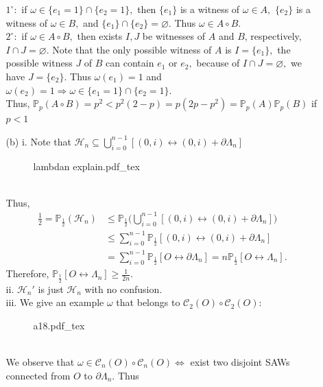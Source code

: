 \documentclass[12pt,a4paper]{report}
\theoremstyle{definition}
\newcommand{\incfig}[1]{%
{#1.pdf_tex}
}
\begin{document}
\begin{enumerate}
\begin{enumerate}
\[        \]
        $1^{\circ}:$ if $\omega\in \{e_1=1\}\cap \{e_2=1\},$ then $\{e_1\}$ is a witness of $\omega \in A,$ $\{e_2\}$ is a witness of $\omega\in B,$ and $\{e_1\}\cap\{e_2\}=\varnothing.$ Thus $\omega\in A\circ B.$\\[5pt]
        $2^{\circ}:$ if $\omega\in A\circ B,$ then exists $I,J$ be witnesses of $A$ and $B$, respectively, $I\cap J=\varnothing.$ Note that the only possible witness of $A$ is $I=\{e_1\},$ the possible witness $J$ of $B$ can contain $e_1$ or $e_2,$ because of $I\cap J=\varnothing,$ we have $J=\{e_2\}.$ Thus $\omega(e_1)=1$ and $\omega(e_2)=1\Rightarrow \omega\in \{e_1=1\}\cap\{e_2=1\}.$\\[7pt]
        Thus, $\mathbb{P}_p(A\circ B)=p^2<p^2(2-p)=p(2p-p^2)=\mathbb{P}_p(A)\mathbb{P}_{p}(B)$ if $p<1$
        \item[(b)] i. Note that $\mathcal{H}_{n}\subseteq \bigcup_{i=0}^{n-1}[(0,i)\leftrightarrow (0,i)+\partial\Lambda_n]$
    	\begin{figure}[htp]
    	\centering
        \def\svgwidth{8cm}
        \incfig{lambdan explain}
        \end{figure}\\
        Thus,
        \newpage
        \begin{align*}
        \frac{1}{2}=\mathbb{P}_\frac{1}{2}(\mathcal{H}_{n})&\leq \mathbb{P}_\frac{1}{2}\Big(\bigcup_{i=0}^{n-1}[(0,i)\leftrightarrow (0,i)+\partial\Lambda_n]\Big)\\
        &\leq\sum_{i=0}^{n-1}\mathbb{P}_\frac{1}{2}[(0,i)\leftrightarrow (0,i)+\partial\Lambda_n]\\
        &=\sum_{i=0}^{n-1}\mathbb{P}_\frac{1}{2}[O\leftrightarrow\partial\Lambda_n]=n\mathbb{P}_\frac{1}{2}[O\leftrightarrow\Lambda_n].
        \end{align*}
        Therefore, $\mathbb{P}_\frac{1}{2}[O\leftrightarrow\Lambda_n]\geq \frac{1}{2n}.$\\[7pt]
        ii. $\mathcal{H}_n'$ is just $\mathcal{H}_n$ with no confusion.\\[7pt]
        iii. We give an example $\omega$ that belongs to $\mathcal{C}_2(O)\circ \mathcal{C}_2(O):$
    	\begin{figure}[htp]
    	\centering
        \def\svgwidth{6cm}
        \incfig{a18}
        \end{figure}\\
        We observe that $ \omega\in \mathcal{C}_n(O)\circ \mathcal{C}_n(O)\Leftrightarrow$ exist two disjoint SAWs connected from $O$ to $\partial\Lambda_n.$ Thus 

\end{enumerate}
\end{enumerate}
\end{document}
